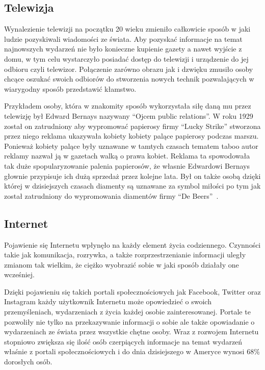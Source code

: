 \subsection{Telewizja}
Wynalezienie telewizji na początku 20 wieku zmieniło całkowicie sposób w jaki ludzie pozyskiwali wiadomości ze świata.
Aby pozyskać informacje na temat najnowszych wydarzeń nie było konieczne kupienie gazety a nawet 
wyjście z domu, w tym celu wystarczyło posiadać dostęp do telewizji i urządzenie do jej odbioru czyli telewizor. Połączenie zarówno obrazu
jak i dzwięku zmusiło osoby chcące oszukać swoich odbiorów do stworzenia nowych technik 
pozwalających w wiarygodny sposób przedstawić kłamstwo.

Przykładem osoby, która w znakomity sposób wykorzystała siłę daną mu przez telewizję był Edward Bernays
nazywany ``Ojcem public relations''.
W roku 1929 został on zatrudniony aby wypromować papierosy firmy ``Lucky Strike''
stworzona przez niego reklama ukazywała kobiety kobiety palące papierosy podczas marszu. 
Ponieważ kobiety palące były uznawane w tamtych czasach tematem
taboo autor reklamy nazwał ją w gazetach walką o prawa kobiet. Reklama ta spowodowała tak duże 
spopularyzowanie palenia papierosów, że własnie Edwardowi Bernays głownie przypisuje
ich dużą sprzedaż przez kolejne lata.
Był on także osobą dzięki której w dzisiejszych czasach diamenty są uznawane za symbol miłości po tym jak
został zatrudniony do wypromowania diamentów firmy ``De Beers''~\cite{MarkDice}.

\subsection{Internet}
Pojawienie się Internetu wpłynęło na każdy element życia codziennego. Czynności takie jak komunikacja, rozrywka,
a także rozprzestrzenianie informacji uległy zmianom tak wielkim, że ciężko wyobrazić sobie w jaki sposób działały
one wcześniej. 

Dzięki pojawieniu się takich portali społecznościowych jak Facebook, Twitter oraz Instagram każdy użytkownik
Internetu może opowiedzieć o swoich przemyśleniach, wydarzeniach z życia każdej osobie zainteresowanej. Portale te
pozwoliły nie tylko na przekazywanie informacji o sobie ale także opowiadanie o wydarzeniach ze świata przez wszystkie
chętne osoby. Wraz z rozwojem Internetu stopniowo zwiększa się ilość osób czerpiących informacje na temat wydarzeń
właśnie z portali społecznościowych i do dnia dzisiejszego w Ameryce wynosi 68\% dorosłych osób. 

